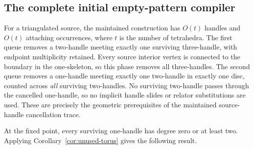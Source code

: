 \subsection{The complete initial empty-pattern compiler}

For a triangulated source, the maintained construction has $O(t)$ handles
and $O(t)$ attaching occurrences, where $t$ is the number of tetrahedra.
The first queue removes a two-handle meeting exactly one surviving
three-handle, with endpoint multiplicity retained.  Every source interior
vertex is connected to the boundary in the one-skeleton, so this phase
removes all three-handles.  The second queue removes a one-handle meeting
exactly one two-handle in exactly one disc, counted across \emph{all}
surviving two-handles.  No surviving two-handle passes through the cancelled
one-handle, so no implicit handle slides or relator substitutions are used.
These are precisely the geometric prerequisites of the maintained
source-handle cancellation trace.

At the fixed point, every surviving one-handle has degree zero or at least
two.  Applying Corollary~\ref{cor:unused-torus} gives the following result.

